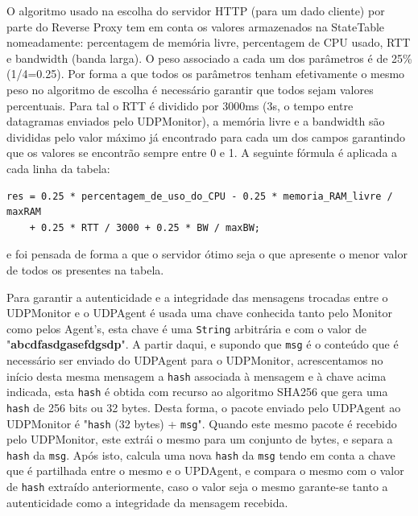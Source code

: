 \documentclass{article}
\begin{document}
O algoritmo usado na escolha do servidor HTTP (para um dado cliente) por parte do Reverse Proxy tem em conta os valores armazenados na StateTable nomeadamente: percentagem de memória livre, percentagem de CPU usado, RTT e bandwidth (banda larga). O peso associado a cada um dos parâmetros é de 25\% (1/4=0.25). Por forma a que todos os parâmetros tenham efetivamente o mesmo peso no algoritmo de escolha é necessário garantir que todos sejam valores percentuais. Para tal o RTT é dividido por 3000ms (3s, o tempo entre datagramas enviados pelo UDPMonitor), a memória livre e a bandwidth são divididas pelo valor máximo já encontrado para cada um dos campos garantindo que os valores se encontrão sempre entre 0 e 1. A seguinte fórmula é aplicada a cada linha da tabela:
\begin{verbatim}
res = 0.25 * percentagem_de_uso_do_CPU - 0.25 * memoria_RAM_livre / maxRAM 
	+ 0.25 * RTT / 3000 + 0.25 * BW / maxBW;
\end{verbatim}
e foi pensada de forma a que o servidor ótimo seja o que apresente o menor valor de todos os presentes na tabela.

Para garantir a autenticidade e a integridade das mensagens trocadas entre o UDPMonitor e o UDPAgent é usada uma chave conhecida tanto pelo Monitor como pelos Agent's, esta chave é uma \texttt{String} arbitrária e com o valor de "\textbf{abcdfasdgasefdgsdp}". A partir daqui, e supondo que \texttt{msg} é o conteúdo que é necessário ser enviado do UDPAgent para o UDPMonitor, acrescentamos no início desta mesma mensagem a \texttt{hash} associada à mensagem e à chave acima indicada, esta \texttt{hash} é obtida com recurso ao algoritmo SHA256 que gera uma \texttt{hash} de 256 bits ou 32 bytes. Desta forma, o pacote enviado pelo UDPAgent ao UDPMonitor é "\texttt{hash} (32 bytes) + \texttt{msg}". Quando este mesmo pacote é recebido pelo UDPMonitor, este extrái o mesmo para um conjunto de bytes, e separa a \texttt{hash} da \texttt{msg}. Após isto, calcula uma nova \texttt{hash} da \texttt{msg} tendo em conta a chave que é partilhada entre o mesmo e o UPDAgent, e compara o mesmo com o valor de \texttt{hash} extraído anteriormente, caso o valor seja o mesmo garante-se tanto a autenticidade como a integridade da mensagem recebida.
\end{document}

